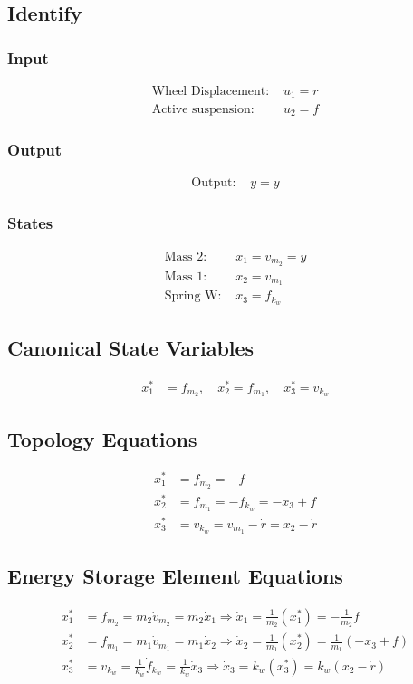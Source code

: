 \documentclass{article}
\begin{document}
\subsection{Identify}
\subsubsection{Input}
\begin{align*}
\text{Wheel Displacement: } & u_1 = r \\
\text{Active suspension: } & u_2 = f
\end{align*}

\subsubsection{Output}
\begin{align*}
\text{Output: } & y = y
\end{align*}

\subsubsection{States}
\begin{align*}
\text{Mass 2: } & x_1 = v_{m_2} = \dot{y} \\
\text{Mass 1: } & x_2 = v_{m_1} \\
\text{Spring W: } & x_3 = f_{k_w}
\end{align*}

\subsection{Canonical State Variables}
\begin{align*}
x^*_1 &= f_{m_2}, \quad x^*_2 = f_{m_1}, \quad x^*_3 = v_{k_w}
\end{align*}

\subsection{Topology Equations}
\begin{align*}
x^*_1 &= f_{m_2} = -f \\
x^*_2 &= f_{m_1} = -f_{k_w} = -x_3 + f \\
x^*_3 &= v_{k_w} = v_{m_1} - \dot{r} = x_2 - \dot{r}
\end{align*}

\subsection{Energy Storage Element Equations}
\begin{align*}
x^*_1 &= f_{m_2} = m_2 \dot{v}_{m_2} = m_2 \dot{x}_1 \Rightarrow \dot{x}_1 = \frac{1}{m_2} (x_1^*) = -\frac{1}{m_2} f \\
x^*_2 &= f_{m_1} = m_1 \dot{v}_{m_1} = m_1 \dot{x}_2 \Rightarrow \dot{x}_2 = \frac{1}{m_1} (x_2^*) = \frac{1}{m_1} (-x_3 + f) \\
x^*_3 &= v_{k_w} = \frac{1}{k_w} \dot{f}_{k_w} = \frac{1}{k_w} \dot{x}_3 \Rightarrow \dot{x}_3 = k_w(x^*_3) = k_w (x_2 - \dot{r})
\end{align*}
\end{document}
